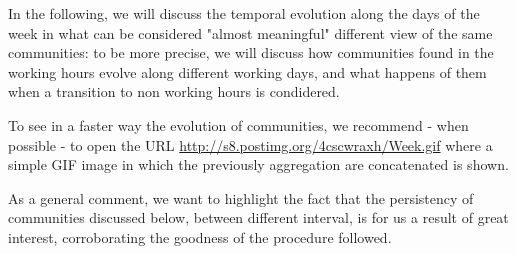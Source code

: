\documentclass[12pt,a4paper]{article}
\begin{document}
In the following, we will discuss the temporal evolution along the days of the week in what can be considered "almost meaningful" different view of the same communities: to be more precise, we will discuss how communities found in the working hours evolve along different working days, and what happens of them when a transition to non working hours is condidered.

To see in a faster way the evolution of communities, we recommend - when possible - to open the URL \href{http://s8.postimg.org/4cscwraxh/Week.gif}{http://s8.postimg.org/4cscwraxh/Week.gif} where a simple GIF image in which the previously aggregation are concatenated is shown.

As a general comment, we want to highlight the fact that the persistency of communities discussed below, between different interval, is for us a result of great interest, corroborating the goodness of the procedure followed.
\end{document}
